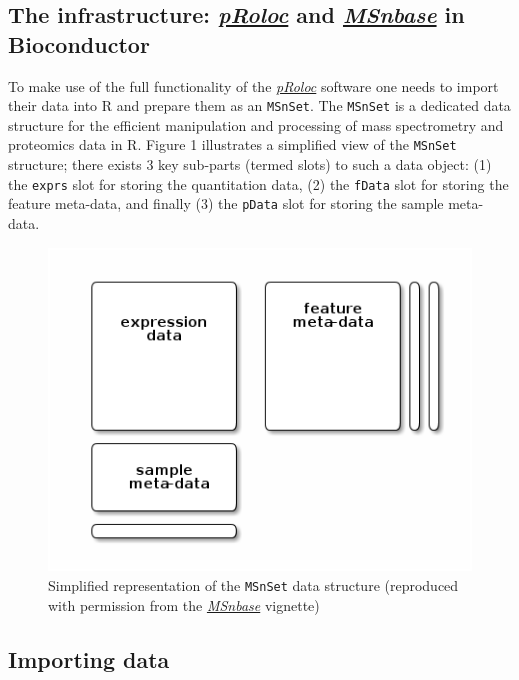 \subsection{The infrastructure:
\emph{\href{http://bioconductor.org/packages/pRoloc}{pRoloc}} and
\emph{\href{http://bioconductor.org/packages/MSnbase}{MSnbase}} in
Bioconductor}\label{the-infrastructure-proloc-and-msnbase-in-bioconductor}

To make use of the full functionality of the
\emph{\href{http://bioconductor.org/packages/pRoloc}{pRoloc}} software
one needs to import their data into R and prepare them as an
\texttt{MSnSet}. The \texttt{MSnSet} is a dedicated data structure for
the efficient manipulation and processing of mass spectrometry and
proteomics data in R. Figure 1 illustrates a simplified view of the
\texttt{MSnSet} structure; there exists 3 key sub-parts (termed slots)
to such a data object: (1) the \texttt{exprs} slot for storing the
quantitation data, (2) the \texttt{fData} slot for storing the feature
meta-data, and finally (3) the \texttt{pData} slot for storing the
sample meta-data.

\begin{figure}[htbp]
\centering
\includegraphics{./Figures/msnset.png}
\caption{Simplified representation of the \texttt{MSnSet} data structure
(reproduced with permission from the
\emph{\href{http://bioconductor.org/packages/MSnbase}{MSnbase}}
vignette)}
\end{figure}

\subsection{Importing data}\label{importing-data}

